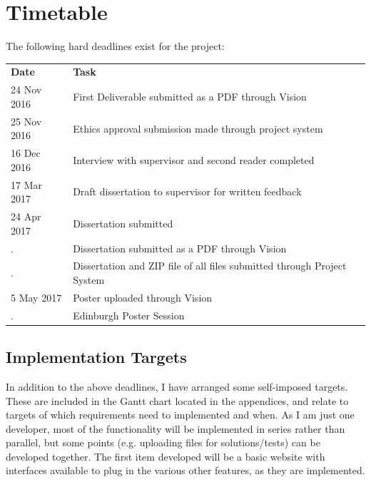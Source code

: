 \documentclass[a4paper,11pt]{report}
\begin{document}
\section{Timetable}
The following hard deadlines exist for the project:\\
\begin{tabularx}{\textwidth}{lX}
\textbf{Date} & \textbf{Task}\\
24 Nov 2016 & First Deliverable submitted as a PDF through Vision\\
25 Nov 2016 & Ethics approval submission made through project system\\
16 Dec 2016 & Interview with supervisor and second reader completed\\
17 Mar 2017 & Draft dissertation to supervisor for written feedback\\
24 Apr 2017 & Dissertation submitted\\
. & Dissertation submitted as a PDF through Vision\\
. & Dissertation and ZIP file of all files submitted through Project System\\
 5 May 2017 & Poster uploaded through Vision\\
. & Edinburgh Poster Session
\end{tabularx}
\subsection*{Implementation Targets}
In addition to the above deadlines, I have arranged some self-imposed targets. These are included in the Gantt chart located in the appendices, and relate to targets of which requirements need to implemented and when. As I am just one developer, most of the functionality will be implemented in series rather than parallel, but some points (e.g. uploading files for solutions/tests) can be developed together. The first item developed will be a basic website with interfaces available to plug in the various other features, as they are implemented.
\end{document}
